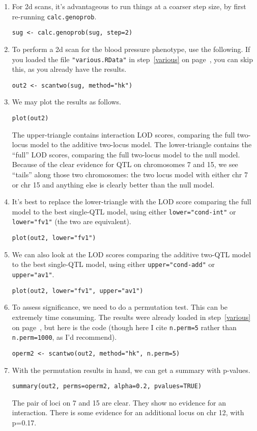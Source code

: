 \documentclass[10pt,letterpaper]{article}
\newcommand{\usercolor}{\color [named]{BlueViolet}}
\begin{document}
\begin{enumerate}
\addtocounter{enumi}{45}
\item For 2d scans, it's advantageous to run things at a coarser step
  size, by first re-running \verb-calc.genoprob-.

\usercolor
\verb|sug <- calc.genoprob(sug, step=2)|
\normalcolor

\item To perform a 2d scan for the blood pressure phenotype, use the
  following.  If you loaded the file \verb-"various.RData"- in
  step~\ref{various} on page~\pageref{various},
  you can skip this, as you already have the results.

\usercolor
\verb|out2 <- scantwo(sug, method="hk")|
\normalcolor

\item We may plot the results as follows.

\usercolor
\verb|plot(out2)|
\normalcolor

The upper-triangle contains interaction LOD scores, comparing the full
two-locus model to the additive two-locus model.  The lower-triangle
contains the ``full'' LOD scores, comparing the full two-locus model
to the null model.  Because of the clear evidence for QTL on
chromosomes 7 and 15, we see ``tails'' along those two chromosomes:
the two locus model with either chr 7 or chr 15 and anything else is clearly better
than the null model.  

\item It's best to replace the lower-triangle with the LOD score comparing the full model to
  the best single-QTL model, using either \verb:lower="cond-int": or
  \verb:lower="fv1": (the two are equivalent).

\usercolor
\verb|plot(out2, lower="fv1")|
\normalcolor

\item We can also look at the LOD scores comparing the additive
  two-QTL model to the best single-QTL model, using either
  \verb:upper="cond-add": or \verb:upper="av1":.

\usercolor
\verb|plot(out2, lower="fv1", upper="av1")|
\normalcolor

\item To assess significance, we need to do a permutation test.  This
  can be extremely time consuming.  The results were already loaded in
  step~\ref{various} on page~\pageref{various}, but here is the code (though here I cite \verb:n.perm=5:
  rather than \verb:n.perm=1000:, as I'd recommend).

\usercolor
\verb|operm2 <- scantwo(out2, method="hk", n.perm=5)|
\normalcolor

\item With the permutation results in hand, we can get a summary with
  p-values.

\usercolor
\verb|summary(out2, perms=operm2, alpha=0.2, pvalues=TRUE)|
\normalcolor

The pair of loci on 7 and 15 are clear.  They show no evidence for an
interaction.  There is some evidence for an additional locus on chr
12, with p=0.17.

\end{enumerate}
\end{document}
